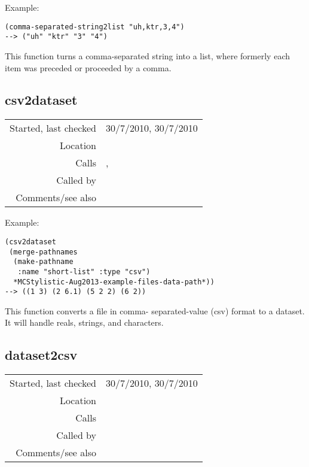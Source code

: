 \vspace{0.5cm}
\noindent Example:
\begin{verbatim}
(comma-separated-string2list "uh,ktr,3,4")
--> ("uh" "ktr" "3" "4")
\end{verbatim}

\noindent This function turns a comma-separated string
into a list, where formerly each item was preceded or
proceeded by a comma.


\subsection*{csv2dataset}\label{fun:csv2dataset}

\vspace{0.3cm}
\begin{tabular}{r|p{8cm}}
Started, last checked & 30/7/2010, 30/7/2010 \\
Location & \nameref{sec:csv-files} \\
Calls & \nameref{fun:comma-separated-integers2list},\newline \nameref{fun:read-from-file-arbitrary} \\
Called by & \nameref{fun:comma-separated-integers2list} \\
Comments/see also & \nameref{fun:tab2dataset}
\end{tabular}

\vspace{0.5cm}
\noindent Example:
\begin{verbatim}
(csv2dataset
 (merge-pathnames
  (make-pathname
   :name "short-list" :type "csv")
  *MCStylistic-Aug2013-example-files-data-path*))
--> ((1 3) (2 6.1) (5 2 2) (6 2))
\end{verbatim}

\noindent This function converts a file in comma-
separated-value (csv) format to a dataset. It will
handle reals, strings, and characters.


\subsection*{dataset2csv}\label{fun:dataset2csv}

\vspace{0.3cm}
\begin{tabular}{r|p{8cm}}
Started, last checked & 30/7/2010, 30/7/2010 \\
Location & \nameref{sec:csv-files} \\
Calls & \nameref{fun:read-from-file} \\
Called by & \\
Comments/see also & \nameref{fun:list-of-lists2csv}
\end{tabular}

